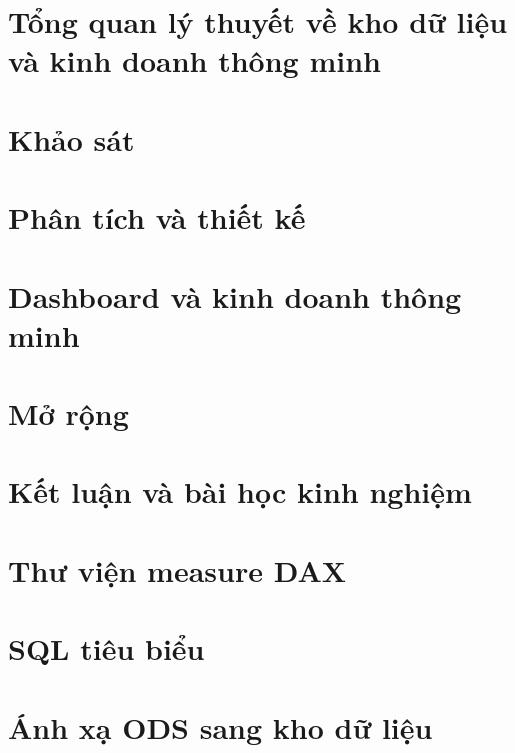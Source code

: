 \documentclass[12pt,a4paper]{report}
\begin{document}




\tableofcontents
\listoffigures
\listoftables

\cleardoublepage
{}
\setcounter{page}{1}

\chapter{Tổng quan lý thuyết về kho dữ liệu và kinh doanh thông minh}


\chapter{Khảo sát}






\chapter{Phân tích và thiết kế}






\chapter{Dashboard và kinh doanh thông minh}


\chapter{Mở rộng}



\chapter{Kết luận và bài học kinh nghiệm}



\renewcommand{\bibname}{Tài liệu tham khảo}


\appendix
\chapter{Thư viện measure DAX}

\chapter{SQL tiêu biểu}

\chapter{Ánh xạ ODS sang kho dữ liệu}

\end{document}
